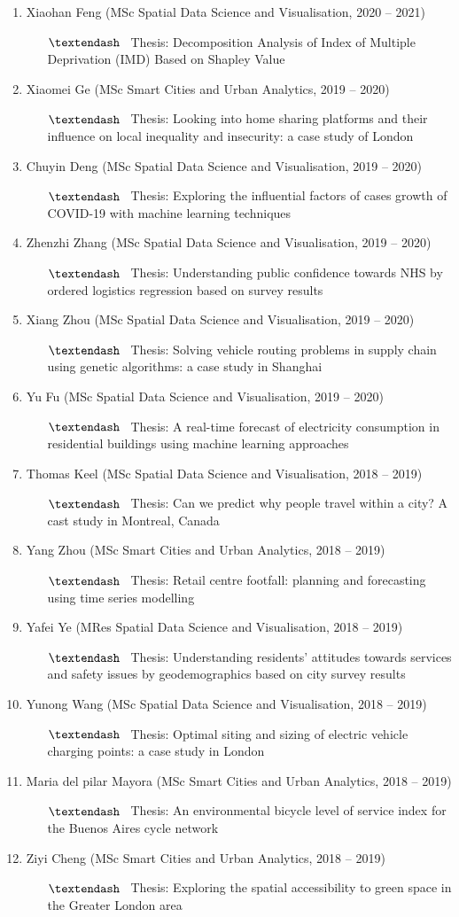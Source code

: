 \documentclass[A4,11pt]{article}
\newcommand{\MScStduentItem}[4]{
  \item #1 (#2, #3)
   \begin{itemize}
    \item[$\textendash$] \ #4
   \end{itemize}
}
\begin{document}
\begin{enumerate}
\begin{enumerate}
\begin{enumerate}
           {Thesis: Research on spatial accessibility and spatial inequality of vaccination sites in England}
           \MScStduentItem{Xiaohan Feng}{MSc Spatial Data Science and Visualisation}{2020 -- 2021}
           {Thesis: Decomposition Analysis of Index of Multiple Deprivation (IMD) Based on Shapley Value}
           \MScStduentItem{Xiaomei Ge}{MSc Smart Cities and Urban Analytics}{2019 -- 2020}
           {Thesis: Looking into home sharing platforms and their influence on local inequality and insecurity: a case study of London}
           \MScStduentItem{Chuyin Deng} {MSc Spatial Data Science and Visualisation}{2019 -- 2020}
            {Thesis: Exploring the influential factors of cases growth of COVID-19 with machine learning techniques}
           \MScStduentItem{Zhenzhi Zhang}{MSc Spatial Data Science and Visualisation}{2019 -- 2020}
            {Thesis: Understanding public confidence towards NHS by ordered logistics regression based on survey results}
          \MScStduentItem{Xiang Zhou}{MSc Spatial Data Science and Visualisation}{2019 -- 2020}
           {Thesis: Solving vehicle routing problems in supply chain using genetic algorithms: a case study in Shanghai}
          \MScStduentItem{Yu Fu}{MSc Spatial Data Science and Visualisation}{2019 -- 2020}
           {Thesis: A real-time forecast of electricity consumption in residential buildings using machine learning approaches}
          \MScStduentItem{Thomas Keel}{MSc Spatial Data Science and Visualisation}{2018 -- 2019}
           {Thesis: Can we predict why people travel within a city? A cast study in Montreal, Canada}
          \MScStduentItem{Yang Zhou}{MSc Smart Cities and Urban Analytics}{2018 -- 2019}
           {Thesis: Retail centre footfall: planning and forecasting using time series modelling}
          \MScStduentItem{Yafei Ye}{MRes Spatial Data Science and Visualisation}{2018 -- 2019}
           {Thesis: Understanding residents’ attitudes towards services and safety issues by geodemographics based on city survey results}
          \MScStduentItem{Yunong Wang}{MSc Spatial Data Science and Visualisation}{2018 -- 2019}
           {Thesis: Optimal siting and sizing of electric vehicle charging points: a case study in London}
          \MScStduentItem{Maria del pilar Mayora}{MSc Smart Cities and Urban Analytics}{2018 -- 2019}
           {Thesis: An environmental bicycle level of service index for the Buenos Aires cycle network}
          \MScStduentItem{Ziyi Cheng}{MSc Smart Cities and Urban Analytics}{2018 -- 2019}
           {Thesis: Exploring the spatial accessibility to green space in the Greater London area}

       \end{enumerate}
     \end{enumerate}
\end{enumerate}  
\end{document}
